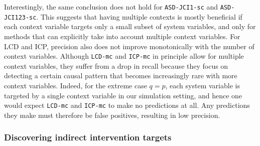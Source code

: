 \documentclass[twoside,11pt]{article}
\newcommand{\alg}[1]{\texttt{#1}}
\newcommand{\Joris}[1]{{\color{blue}#1}}
\begin{document}
Interestingly, the same conclusion does not hold for \alg{ASD-JCI1-sc} and \alg{ASD-JCI123-sc}.
This suggests that having multiple contexts is mostly beneficial if each context variable targets only a 
small subset of system variables, and only for methods that can explicitly take into account multiple context variables.
For LCD and ICP, precision also does not improve monotonically with the number of context variables.
Although \alg{LCD-mc} and
\alg{ICP-mc} in principle allow for multiple context variables, they suffer from a drop in recall because they focus on
detecting a certain causal pattern that becomes increasingly rare with more context variables. Indeed, for the extreme
case $q=p$, each system variable is targeted by a single context variable in our simulation setting, and hence one would
expect \alg{LCD-mc} and \alg{ICP-mc} to make no predictions at all. Any predictions they make must therefore be false 
positives, resulting in low precision.


\subsubsection{Discovering indirect intervention targets}
\end{document}
